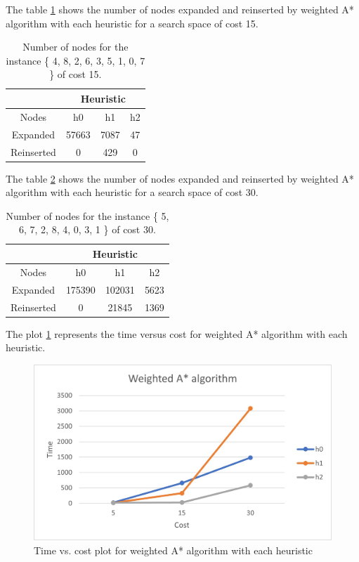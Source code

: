 \documentclass[runningheads]{llncs}
\begin{document}
The table \ref{tab:table5} shows the number of nodes expanded and reinserted by weighted A* algorithm with each heuristic for a search space of cost 15.
\begin{table}
    \centering
\caption{\label{tab:table5}Number of nodes for the instance \{ 4, 8, 2, 6, 3, 5, 1, 0, 7 \} of cost 15.}
    \begin{tabular}{|c|c|c|c|}
    \hline
       & \multicolumn{3}{|c|}{Heuristic} \\ \hline
        Nodes & h0 & h1 & h2 \\ \hline
        Expanded & 57663 & 7087 & 47 \\ \hline
        Reinserted & 0 & 429 & 0 \\ \hline
    \end{tabular}
\end{table}

The table \ref{tab:table6} shows the number of nodes expanded and reinserted by weighted A* algorithm with each heuristic for a search space of cost 30.
\begin{table}
    \centering
\caption{\label{tab:table6}Number of nodes for the instance \{ 5, 6, 7, 2, 8, 4, 0, 3, 1 \} of cost 30.}
    \begin{tabular}{|c|c|c|c|}
    \hline
       & \multicolumn{3}{|c|}{Heuristic} \\ \hline
        Nodes & h0 & h1 & h2 \\ \hline
        Expanded & 175390 & 102031 & 5623 \\ \hline
        Reinserted & 0 & 21845 & 1369 \\ \hline
    \end{tabular}
\end{table}

The plot \ref{fig:wastar} represents the time versus cost for weighted A* algorithm with each heuristic.
\begin{figure}[H]
    \centering
    \includegraphics{WeightedAStarTimes.jpg}
    \caption{Time vs. cost plot for weighted A* algorithm with each heuristic}
    \label{fig:wastar}
\end{figure}
\end{document}
